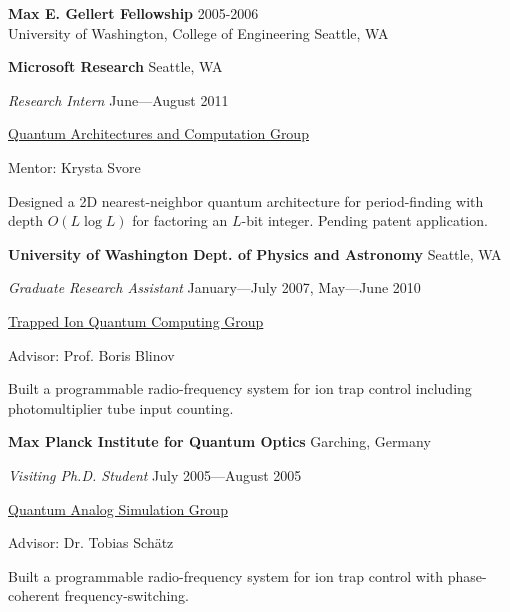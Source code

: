 \documentclass[letter]{article}
\begin{document}
\vspace{\baselineskip}
\par
{\bf {Max E. Gellert Fellowship}} \hfill 2005-2006\\
University of Washington, College of Engineering \hfill Seattle, WA

\par

\pagebreak

\vspace{\baselineskip}
\par
{\bf {Microsoft Research}} \hfill Seattle, WA
\par
{\em Research Intern} \hfill June---August 2011
\par
\href{http://research.microsoft.com/en-us/groups/quarc/default.aspx}{Quantum Architectures and Computation Group}
\par
Mentor: Krysta Svore
\par
Designed a 2D nearest-neighbor quantum architecture for period-finding with
depth $O(L \log L)$ for factoring an $L$-bit integer. Pending patent
application.

\vspace{\baselineskip}
\par
{\bf {University of Washington Dept. of Physics and Astronomy}} \hfill Seattle, WA
\par
{\em Graduate Research Assistant} \hfill January---July 2007, May---June 2010
\par
\href{http://depts.washington.edu/qcomp/}{Trapped Ion Quantum Computing Group}
\par
Advisor: Prof. Boris Blinov
\par
Built a programmable radio-frequency system for ion trap control including
photomultiplier tube input counting.

\par

\vspace{\baselineskip}
\par
{\bf Max Planck Institute for Quantum Optics} \hfill Garching, Germany
\par
{\em Visiting Ph.D. Student} \hfill July 2005---August 2005
\par
\href{http://www.mpq.mpg.de/qsim/}{Quantum Analog Simulation Group}
\par
Advisor: Dr. Tobias Sch\"atz
\par
Built a programmable radio-frequency system for ion trap control with phase-coherent
frequency-switching.
\end{document}
